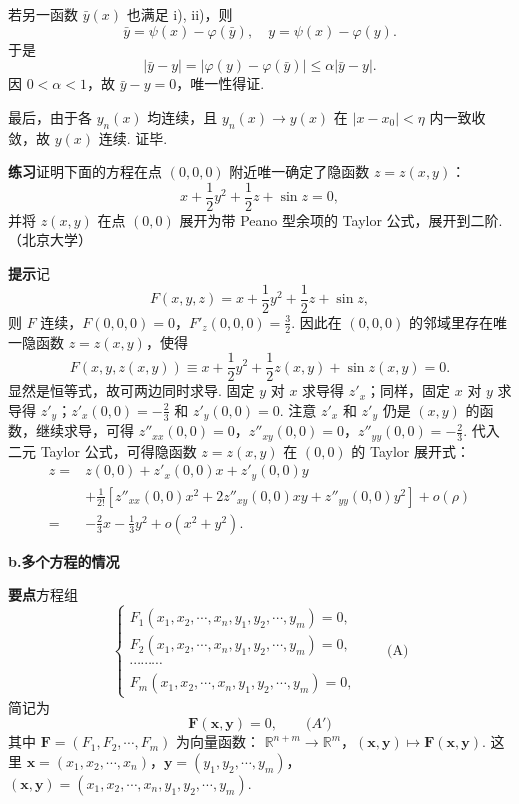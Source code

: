 \documentclass[UTF8,12pt,a4paper,fontset=fandol]{ctexart}
\begin{document}
若另一函数 $\bar y(x)$ 也满足 i), ii)，则
\[
  \bar y=\psi(x)-\varphi(\bar y),\quad
  y=\psi(x)-\varphi(y).
\]
于是
\[
  |\bar y-y|=|\varphi(y)-\varphi(\bar y)|
  \le\alpha|\bar y-y|.
\]
因 $0<\alpha<1$，故 $\bar y-y=0$，唯一性得证.

最后，由于各 $y_n(x)$ 均连续，且 $y_n(x)\to y(x)$ 在 $|x-x_0|<\eta$ 内一致收敛，故 $y(x)$ 连续. 证毕.

\noindent\textbf{练习}\quad 证明下面的方程在点 $(0,0,0)$ 附近唯一确定了隐函数 $z=z(x,y)$：
\[
  x+\frac12 y^2+\frac12 z+\sin z=0,
\]
并将 $z(x,y)$ 在点 $(0,0)$ 展开为带 Peano 型余项的 Taylor 公式，展开到二阶.（北京大学）

\noindent\textbf{提示}\quad 记
\[
  F(x,y,z)=x+\frac12 y^2+\frac12 z+\sin z,
\]
则 $F$ 连续，$F(0,0,0)=0$，$F'_z(0,0,0)=\frac32$. 因此在 $(0,0,0)$ 的邻域里存在唯一隐函数 $z=z(x,y)$，使得
\[
  F(x,y,z(x,y))\equiv
  x+\frac12 y^2+\frac12 z(x,y)+\sin z(x,y)=0.
\]
显然是恒等式，故可两边同时求导. 固定 $y$ 对 $x$ 求导得 $z'_x$；同样，固定 $x$ 对 $y$ 求导得 $z'_y$；$z'_x(0,0)=-\frac23$ 和 $z'_y(0,0)=0$. 注意 $z'_x$ 和 $z'_y$ 仍是 $(x,y)$ 的函数，继续求导，可得 $z''_{xx}(0,0)=0$，$z''_{xy}(0,0)=0$，$z''_{yy}(0,0)=-\frac23$. 代入二元 Taylor 公式，可得隐函数 $z=z(x,y)$ 在 $(0,0)$ 的 Taylor 展开式：
\[
\begin{aligned}
  z={}&z(0,0)+z'_x(0,0)x+z'_y(0,0)y  \\
  &+\frac1{2!}\left[z''_{xx}(0,0)x^2+2z''_{xy}(0,0)xy+z''_{yy}(0,0)y^2\right]+o(\rho) \\
  ={}&-\frac23x-\frac13y^2+o(x^2+y^2).
\end{aligned}
\]

\noindent\textbf{b.\quad 多个方程的情况}

\noindent\textbf{要点}\quad 方程组
\[
\begin{cases}
  F_1(x_1,x_2,\cdots,x_n,y_1,y_2,\cdots,y_m)=0,\\
  F_2(x_1,x_2,\cdots,x_n,y_1,y_2,\cdots,y_m)=0,\\
  \cdots\cdots\cdots\\
  F_m(x_1,x_2,\cdots,x_n,y_1,y_2,\cdots,y_m)=0,
\end{cases}\qquad\text{(A)}
\]
简记为
\[
  \mathbf F(\mathbf x,\mathbf y)=0,\qquad\text{($A'$)}
\]
其中 $\mathbf F=(F_1,F_2,\cdots,F_m)$ 为向量函数：
$\mathbb R^{n+m}\to\mathbb R^m$，$(\mathbf x,\mathbf y)\mapsto
\mathbf F(\mathbf x,\mathbf y)$. 这里
$\mathbf x=(x_1,x_2,\cdots,x_n)$，$\mathbf y=(y_1,y_2,\cdots,y_m)$，
$(\mathbf x,\mathbf y)=(x_1,x_2,\cdots,x_n,y_1,y_2,\cdots,y_m)$.
\end{document}
